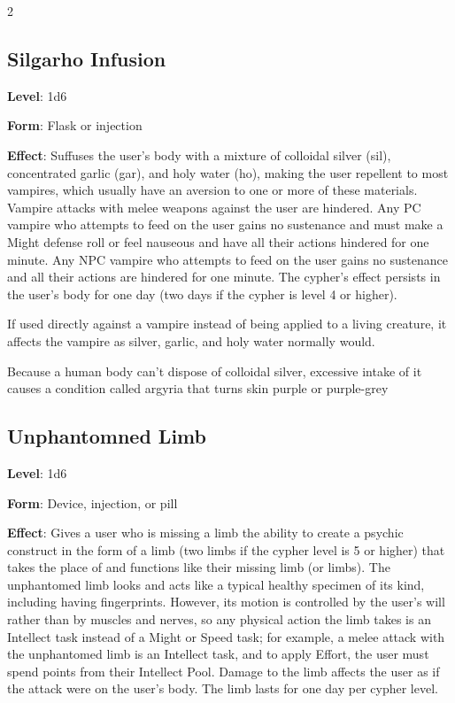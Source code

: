 \begin{multicols}{2}
\subsection{Silgarho Infusion}

\textbf{Level}: 1d6

\textbf{Form}: Flask or injection

\textbf{Effect}: Suffuses the user’s body with a mixture of colloidal silver (sil), concentrated garlic (gar), and holy water (ho), making the user repellent to most vampires, which usually have an aversion to one or more of these materials. Vampire attacks with melee weapons against the user are hindered. Any PC vampire who attempts to feed on the user gains no sustenance and must make a Might defense roll or feel nauseous and have all their actions hindered for one minute. Any NPC vampire who attempts to feed on the user gains no sustenance and all their actions are hindered for one minute. The cypher’s effect persists in the user’s body for one day (two days if the cypher is level 4 or higher).

If used directly against a vampire instead of being applied to a living creature, it affects the vampire as silver, garlic, and holy water normally would.

Because a human body can’t dispose of colloidal silver, excessive intake of it causes a condition called argyria that turns skin purple or purple-grey

\subsection{Unphantomned Limb}

​​\textbf{Level}: 1d6

\textbf{Form}: Device, injection, or pill 

\textbf{Effect}: Gives a user who is missing a
limb the ability to create a psychic construct in the form of a limb (two limbs if the cypher level is 5 or higher) that takes the place of and functions like their missing limb (or limbs). The unphantomed limb looks and acts like a typical healthy specimen of its kind, including having fingerprints. However, its motion is controlled by the user’s will rather than by muscles and nerves, so any physical action the limb takes is an Intellect task instead of a Might or Speed task; for example, a melee attack with the unphantomed limb is an Intellect task, and to apply Effort, the user must spend points from their Intellect Pool. Damage to the limb affects the user as if the attack were on the user’s body. The limb lasts for one day per cypher level.


\end{multicols}
